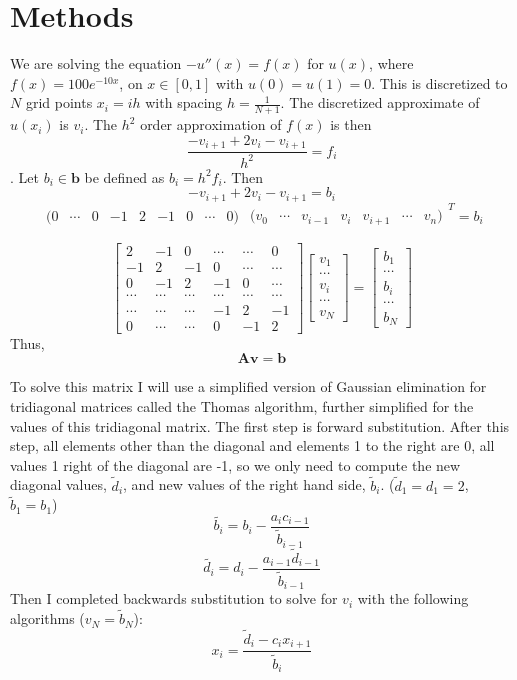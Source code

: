 \documentclass[11pt]{article}
\begin{document}
\section{Methods}
We are solving the equation $-u''(x)=f(x)$ for $u(x)$, where $f(x)=100e^{-10x}$, on $x\in[0,1]$ with $u(0)=u(1)=0$. This is discretized to $N$ grid points $x_i=ih$ with spacing $h=\frac{1}{N+1}$. The discretized approximate of $u(x_i)$ is $v_i$. The $h^2$ order approximation of $f(x)$ is then $$\frac{-v_{i+1}+2v_i-v_{i+1}}{h^2}=f_i$$.
Let $b_i\in\mathbf{b}$ be defined as $b_i=h^2f_i$. Then
$$-v_{i+1}+2v_i-v_{i+1}=b_i$$
$$\begin{matrix}
(0& \cdots&0&-1& 2 & -1 & 0 & \cdots & 0)
\end{matrix}
\begin{matrix}
(v_0&\cdots&v_{i-1}&v_{i}&v_{i+1}&\cdots&v_n)
\end{matrix}^T=b_i$$

$$\begin{bmatrix}
2&-1&0&\cdots&\cdots&0\\
-1&2&-1&0&\cdots&\cdots\\
0&-1&2&-1&0&\cdots\\
\cdots&\cdots&\cdots&\cdots&\cdots&\cdots\\
\cdots&\cdots&\cdots&-1&2&-1\\
0&\cdots&\cdots&0&-1&2
\end{bmatrix}
\begin{bmatrix}
v_1\\\cdots\\v_i\\\cdots\\v_N
\end{bmatrix}
=
\begin{bmatrix}
b_1\\\cdots\\b_i\\\cdots\\b_N
\end{bmatrix}$$
Thus,
$$
\mathbf{Av}=\mathbf{b}
$$

To solve this matrix I will use a simplified version of Gaussian elimination for tridiagonal matrices called the Thomas algorithm, further simplified for the values of this tridiagonal matrix. The first step is forward substitution. After this step, all elements other than the diagonal and elements 1 to the right are 0, all values 1 right of the diagonal are -1, so we only need to compute the new diagonal values, $\tilde{d}_i$, and new values of the right hand side, $\tilde{b}_i$. ($\tilde{d}_1=d_1=2$, $\tilde{b}_1=b_1$)
$$\tilde{b_i} = b_i - \frac{a_ic_{i-1}}{\tilde{b}_{i-1}}$$
$$\tilde{d_i} = d_i - \frac{a_{i-1}\tilde{d}_{i-1}}{\tilde{b}_{i-1}}$$
Then I completed backwards substitution to solve for $v_i$ with the following algorithms ($v_N=\tilde{b}_N$):
$$x_i=\frac{\tilde{d}_i-c_ix_{i+1}}{\tilde{b}_i}$$
\end{document}
